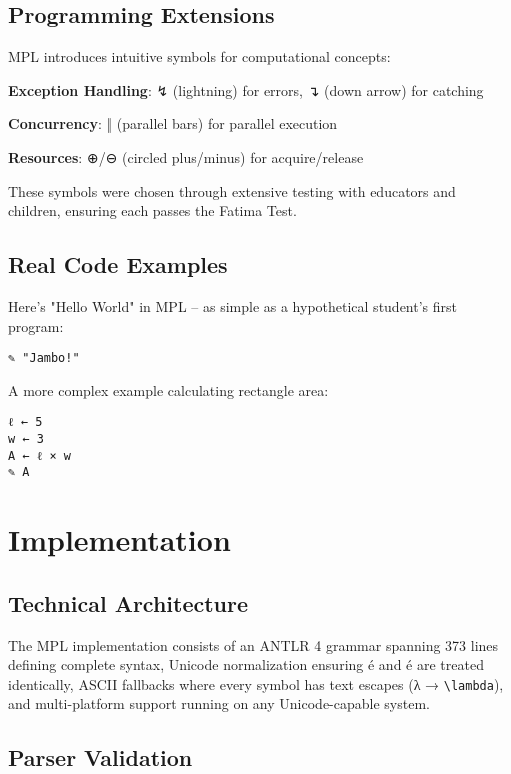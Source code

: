 \documentclass[10pt,conference]{IEEEtran}
\begin{document}
\subsection{Programming Extensions}

MPL introduces intuitive symbols for computational concepts:

\textbf{Exception Handling}: ↯ (lightning) for errors, ↴ (down arrow) for catching

\textbf{Concurrency}: ‖ (parallel bars) for parallel execution

\textbf{Resources}: ⊕/⊖ (circled plus/minus) for acquire/release

These symbols were chosen through extensive testing with educators and children, ensuring each passes the Fatima Test.

\subsection{Real Code Examples}

Here's "Hello World" in MPL – as simple as a hypothetical student's first program:

\begin{lstlisting}[language=MPL]
✎ "Jambo!"
\end{lstlisting}

A more complex example calculating rectangle area:

\begin{lstlisting}[language=MPL]
ℓ ← 5
w ← 3
A ← ℓ × w
✎ A
\end{lstlisting}

\section{Implementation}

\subsection{Technical Architecture}

The MPL implementation consists of an ANTLR 4 grammar spanning 373 lines defining complete syntax, Unicode normalization ensuring é and é are treated identically, ASCII fallbacks where every symbol has text escapes (λ → \texttt{\textbackslash lambda}), and multi-platform support running on any Unicode-capable system.

\subsection{Parser Validation}
\end{document}
